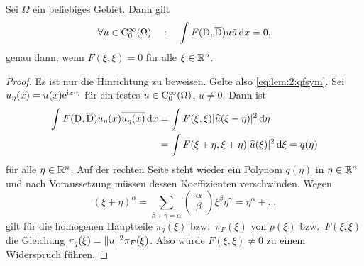 \begin{lem}\label{lem:2:qfsym}
Sei $\Omega$ ein beliebiges Gebiet.
Dann gilt 
\begin{equation}\label{eq:lem:2:qfsym}
\forall u\in\mathrm C_0^\infty(\Omega) \quad:\quad \int F(\mathrm D,\overline{\mathrm D})u\bar{u}\,\mathrm d x=0,
\end{equation}
genau dann, wenn $F(\xi,\xi)=0$ für alle $\xi\in\mathbb R^n$.
\end{lem}
\begin{proof}
Es ist nur die Hinrichtung zu beweisen. Gelte also \eqref{eq:lem:2:qfsym}.
Sei $u_\eta(x)=u(x)\mathrm e^{\mathrm i {x}\cdot{\eta}}$ für ein festes $u\in \mathrm C^\infty_0(\Omega)$, $u\neq0$.
Dann ist
\begin{align}
\int F(\mathrm D,\overline{\mathrm D})u_\eta(x)\overline{u_\eta(x)}\,\mathrm d x
&=\int F(\xi,\xi)\lvert\widehat{u}(\xi-\eta)\rvert^2\,\mathrm d \eta\notag\\&
=\int F(\xi+\eta,\xi+\eta)\lvert\widehat{u}(\xi)\rvert^2\,\mathrm d \xi=q(\eta)
\end{align}
für alle $\eta\in\mathbb R^n$.
Auf der rechten Seite steht wieder ein Polynom $q(\eta)$ in $\eta\in\mathbb R^n$
und nach Voraussetzung müssen dessen Koeffizienten verschwinden.
Wegen
\begin{equation}
(\xi+\eta)^\alpha=\sum_{\beta+\gamma=\alpha}\begin{pmatrix}\alpha\\\beta\end{pmatrix}\xi^\beta\eta^\gamma=\eta^\alpha+\dots
\end{equation}
gilt für die homogenen Hauptteile $\pi_q(\xi)$ bzw.~$\pi_F(\xi)$
von $p(\xi)$ bzw.~$F(\xi,\xi)$ die Gleichung $\pi_q(\xi)=\lVert u\rVert^2\pi_F(\xi)$.
Also würde $F(\xi,\xi)\neq0$ zu einem Widerspruch führen.
\end{proof}

